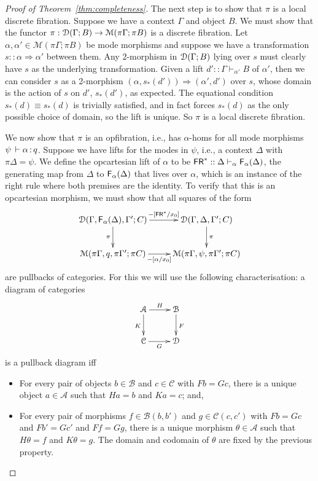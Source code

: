 \documentclass[a4paper,USenglish,numberwithinsect]{lipics-v2016}
\newcommand\deq{\ensuremath{\equiv}}
\newcommand\spr{\ensuremath{\Rightarrow}} %
\newcommand\seq[3]{\ensuremath{#1 \vdash_{#2} #3}}
\newcommand\F[2]{\ensuremath{\dsd{F}_{#1}(#2)}}
\renewcommand{\oftp}[3]{\ensuremath{#1 \, \vdash #2 \, \dcd{:} \, #3}}
\newcommand\FR{\dsd{FR}}
\def\M{\mathcal{M}}
\newcommand\Cut[3]{\ensuremath{#1[#2/#3]}}
\begin{document}
\begin{proof}[Proof of Theorem~\ref{thm:completeness}]
The next step is to show that $\pi$ is a local discrete
fibration. Suppose we have a context $\Gamma$ and object $B$. We must
show that the functor $\pi : \cD(\Gamma; B) \to \M(\pi \Gamma; \pi B)$
is a discrete fibration. Let $\alpha, \alpha' \in \M(\pi \Gamma; \pi B)$
be mode morphisms and suppose we have a transformation $s :: \alpha \spr
\alpha'$ between them. Any 2-morphism in $\mathcal{D}(\Gamma; B)$ lying over $s$
must clearly have $s$ as the underlying transformation. Given a lift $d'
:: \seq{\Gamma}{\alpha'}{B}$ of $\alpha'$, then we can consider $s$ as a
2-morphism $(\alpha, s_*(d')) \spr (\alpha',d')$ over $s$, whose domain
is the action of $s$ on $d'$, $s_*(d')$, as expected.  The equational
condition $s_*(d) \deq s_*(d)$ is trivially satisfied, and in fact
forces $s_*(d)$ as the only possible choice of domain, so the lift is
unique. So $\pi$ is a local discrete fibration.

We now show that $\pi$ is an opfibration, i.e., has $\alpha$-homs for
all mode morphisms $\oftp{\psi}{\alpha}{q}$. Suppose we have lifts for
the modes in $\psi$, i.e., a context $\Delta$ with $\pi\Delta =
\psi$. We define the opcartesian lift of $\alpha$ to be $\FR^* ::
\seq{\Delta}{\alpha}{\F{\alpha}{\Delta}}$, the generating map from
$\Delta$ to ${\F{\alpha}{\Delta}}$ that lives over $\alpha$, which is an
instance of the  right rule where both premises are the
identity. To verify that this is an opcartesian morphism, we must show
that all squares of the form
\[ \xymatrix{
    \cD(\Gamma,\F{\alpha}{\Delta},\Gamma';C) \ar[r]^-{\Cut{-}{\FR^*}{x_0}} \ar[d]_\pi &
    \cD(\Gamma,\Delta,\Gamma';C) \ar[d]^\pi \\
    \M(\pi \Gamma, q, \pi \Gamma'; \pi C) \ar[r]_-{\Cut{-}{\alpha}{x_0}} &
    \M(\pi\Gamma,\psi,\pi\Gamma'; \pi C)
}\]
are pullbacks of categories. For this we will use the following characterisation:
a diagram of categories
\[ \xymatrix{
    \mathcal{A} \ar[r]^-{H} \ar[d]_K & \mathcal{B} \ar[d]^F \\
    \mathcal{C} \ar[r]_-{G} & \mathcal{D}
  }\]
is a pullback diagram iff
\begin{itemize}
\item For every pair of objects $b \in \mathcal{B}$ and $c \in
  \mathcal{C}$ with $Fb = Gc$, there is a unique object $a \in
  \mathcal{A}$ such that $Ha = b$ and $Ka = c$; and,

\item For every pair of morphisms $f \in \mathcal{B}(b,b')$ and $g \in
  \mathcal{C}(c,c')$ with $F b = G c$ and $F b' = G c'$ and $Ff= Gg$,
  there is a unique morphism $\theta \in \mathcal{A}$ such that $H\theta
  = f$ and $K\theta = g$. The domain and codomain of $\theta$ are fixed
  by the previous property.
\end{itemize}


\end{proof}
\end{document}
